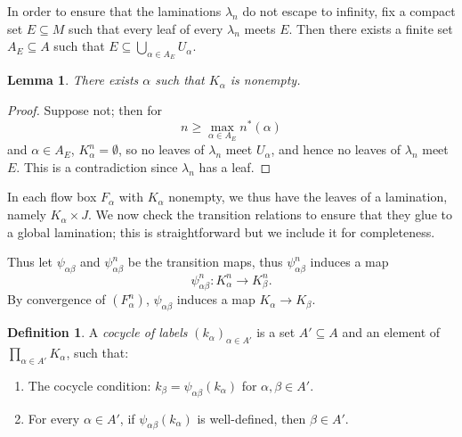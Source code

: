 \documentclass[reqno,11pt]{amsart}
\newcommand{\dfn}[1]{\emph{#1}\index{#1}}
\newtheorem{lemma}[theorem]{Lemma}
\theoremstyle{definition}
\newtheorem{definition}[theorem]{Definition}
\numberwithin{equation}{section}
\begin{document}
In order to ensure that the laminations $\lambda_n$ do not escape to infinity, fix a compact set $E \subseteq M$ such that every leaf of every $\lambda_n$ meets $E$.
Then there exists a finite set $A_E \subseteq A$ such that $E \subseteq \bigcup_{\alpha \in A_E} U_\alpha$.

\begin{lemma}\label{label sets are nonempty}
	There exists $\alpha$ such that $K_\alpha$ is nonempty.
\end{lemma}
\begin{proof}
	Suppose not; then for
	$$n \geq \max_{\alpha \in A_E} n^*(\alpha)$$
	and $\alpha \in A_E$, $K_\alpha^n = \emptyset$, so no leaves of $\lambda_n$ meet $U_\alpha$, and hence no leaves of $\lambda_n$ meet $E$.
	This is a contradiction since $\lambda_n$ has a leaf.
\end{proof}

In each flow box $F_\alpha$ with $K_\alpha$ nonempty, we thus have the leaves of a lamination, namely $K_\alpha \times J$.
We now check the transition relations to ensure that they glue to a global lamination; this is straightforward but we include it for completeness.

Thus let $\psi_{\alpha \beta}$ and $\psi_{\alpha \beta}^n$ be the transition maps, thus $\psi_{\alpha \beta}^n$ induces a map
$$\psi_{\alpha \beta}^n: K_\alpha^n \to K_\beta^n.$$
By convergence of $(F_\alpha^n)$, $\psi_{\alpha \beta}$ induces a map $K_\alpha \to K_\beta$.

\begin{definition}
	A \dfn{cocycle of labels} $(k_\alpha)_{\alpha \in A'}$ is a set $A' \subseteq A$ and an element of $\prod_{\alpha \in A'} K_\alpha$, such that:
\begin{enumerate}
	\item The cocycle condition: $k_\beta = \psi_{\alpha \beta}(k_\alpha)$ for $\alpha, \beta \in A'$.
	\item For every $\alpha \in A'$, if $\psi_{\alpha \beta}(k_\alpha)$ is well-defined, then $\beta \in A'$.
\end{enumerate}
\end{definition}
\end{document}
